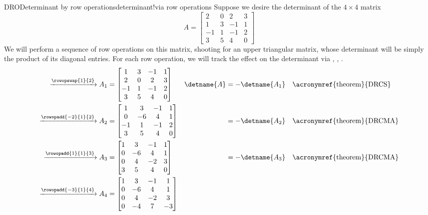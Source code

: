 \begin{example}{DRO}{Determinant by row operations}{determinant!via row operations}
Suppose we desire the determinant of the $4\times 4$ matrix
%
\begin{equation*}
A=
\begin{bmatrix}
2 & 0 & 2 & 3 \\
1 & 3 &-1 & 1 \\
-1& 1 &-1 & 2 \\
3 & 5 & 4 & 0
\end{bmatrix}
\end{equation*}
%
We will perform a sequence of row operations on this matrix, shooting for an upper triangular matrix, whose determinant will be simply the product of its diagonal entries.  For each row operation, we will track the effect on the determinant via , , .
%
\begin{align*}
\xrightarrow{\rowopswap{1}{2}}
A_1&=
\begin{bmatrix}
1 & 3 &-1 & 1 \\
2 & 0 & 2 & 3 \\
-1& 1 &-1 & 2 \\
3 & 5 & 4 & 0
\end{bmatrix}
&
\detname{A}&=-\detname{A_1}&&\text{\acronymref{theorem}{DRCS}}\\
\xrightarrow{\rowopadd{-2}{1}{2}}
A_2&=
\begin{bmatrix}
1 & 3 &-1 & 1 \\
0 &-6 & 4 & 1 \\
-1& 1 &-1 & 2 \\
3 & 5 & 4 & 0
\end{bmatrix}
&
&=-\detname{A_2}&&\text{\acronymref{theorem}{DRCMA}}\\
\xrightarrow{\rowopadd{1}{1}{3}}
A_3&=
\begin{bmatrix}
1 & 3 &-1 & 1 \\
0 &-6 & 4 & 1 \\
0 & 4 &-2 & 3 \\
3 & 5 & 4 & 0
\end{bmatrix}
&
&=-\detname{A_3}&&\text{\acronymref{theorem}{DRCMA}}\\
\xrightarrow{\rowopadd{-3}{1}{4}}
A_4&=
\begin{bmatrix}
1 & 3 &-1 & 1 \\
0 &-6 & 4 & 1 \\
0 & 4 &-2 & 3 \\
0 &-4 & 7 &-3
\end{bmatrix}

\end{align*}
\end{example}
